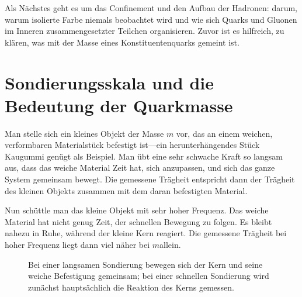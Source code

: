 \begin{classroomqa}
\end{classroomqa}

Als Nächstes geht es um das Confinement und den Aufbau der Hadronen: darum, warum isolierte Farbe niemals beobachtet wird und wie sich Quarks und Gluonen im Inneren zusammengesetzter Teilchen organisieren. Zuvor ist es hilfreich, zu klären, was mit der Masse eines Konstituentenquarks gemeint ist.

\section{Sondierungsskala und die Bedeutung der Quarkmasse}

Man stelle sich ein kleines Objekt der Masse \(m\) vor, das an einem weichen, verformbaren Materialstück befestigt ist---ein herunterhängendes Stück Kaugummi genügt als Beispiel. Man übt eine sehr schwache Kraft so langsam aus, dass das weiche Material Zeit hat, sich anzupassen, und sich das ganze System gemeinsam bewegt. Die gemessene Trägheit entspricht dann der Trägheit des kleinen Objekts zusammen mit dem daran befestigten Material.

Nun schüttle man das kleine Objekt mit sehr hoher Frequenz. Das weiche Material hat nicht genug Zeit, der schnellen Bewegung zu folgen. Es bleibt nahezu in Ruhe, während der kleine Kern reagiert. Die gemessene Trägheit bei hoher Frequenz liegt dann viel näher bei \(m\)allein.

\begin{figure}[h]
\centering
{}
\caption{Bei einer langsamen Sondierung bewegen sich der Kern und seine weiche Befestigung gemeinsam; bei einer schnellen Sondierung wird zunächst hauptsächlich die Reaktion des Kerns gemessen.}
\end{figure}

